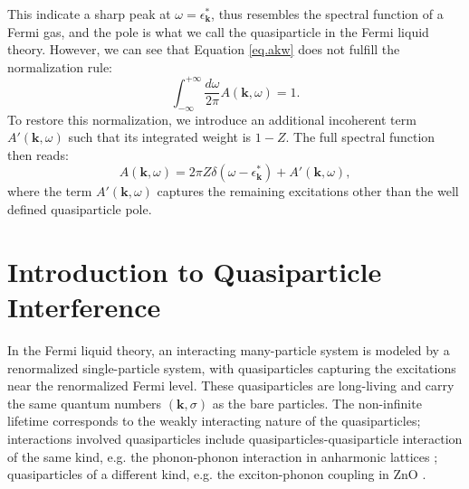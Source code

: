 This indicate a sharp peak at $\omega=\epsilon^*_\textbf{k}$, thus resembles the spectral function of a Fermi gas, and the pole is what we call the quasiparticle in the Fermi liquid theory. However, we can see that Equation \ref{eq.akw} does not fulfill the normalization rule: 
\begin{equation}
	\int_{-\infty}^{+\infty} \frac{d\omega}{2\pi} A(\textbf{k},\omega) = 1. 
\end{equation}
To restore this normalization, we introduce an additional incoherent term $A'(\mathbf{k},\omega)$ such that its integrated weight is $1 - Z$. The full spectral function then reads:
\begin{equation}
	\label{eq.akw}
	A(\textbf{k},\omega) = 2\pi Z\delta(\omega-\epsilon^*_\textbf{k}) + A'(\textbf{k},\omega),
\end{equation}
where the term $A'(\textbf{k},\omega)$ captures the remaining excitations other than the well defined quasiparticle pole. 


\section{Introduction to Quasiparticle Interference}

In the Fermi liquid theory, an interacting many-particle system is modeled by a renormalized single-particle system, with quasiparticles capturing the excitations near the renormalized Fermi level. These quasiparticles are long-living and carry the same quantum numbers $(\textbf{k}, \sigma)$ as the bare particles. The non-infinite lifetime corresponds to the weakly interacting nature of the quasiparticles; interactions involved quasiparticles include quasiparticles-quasiparticle interaction of the same kind, e.g. the phonon-phonon interaction in anharmonic lattices \cite{kimExploringAnharmonicLattice2023}; quasiparticles of a different kind, e.g. the exciton-phonon coupling in ZnO \cite{mendelsbergPhotoluminescenceExcitonphononCoupling2011}. 

